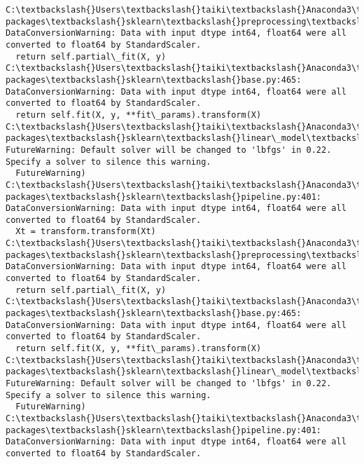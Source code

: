 \documentclass[a4j, dvipdfmx]{jsarticle}
\begin{document}
    \begin{Verbatim}[commandchars=\\\{\}]
C:\textbackslash{}Users\textbackslash{}taiki\textbackslash{}Anaconda3\textbackslash{}Lib\textbackslash{}site-packages\textbackslash{}sklearn\textbackslash{}preprocessing\textbackslash{}data.py:625: DataConversionWarning: Data with input dtype int64, float64 were all converted to float64 by StandardScaler.
  return self.partial\_fit(X, y)
C:\textbackslash{}Users\textbackslash{}taiki\textbackslash{}Anaconda3\textbackslash{}Lib\textbackslash{}site-packages\textbackslash{}sklearn\textbackslash{}base.py:465: DataConversionWarning: Data with input dtype int64, float64 were all converted to float64 by StandardScaler.
  return self.fit(X, y, **fit\_params).transform(X)
C:\textbackslash{}Users\textbackslash{}taiki\textbackslash{}Anaconda3\textbackslash{}Lib\textbackslash{}site-packages\textbackslash{}sklearn\textbackslash{}linear\_model\textbackslash{}logistic.py:433: FutureWarning: Default solver will be changed to 'lbfgs' in 0.22. Specify a solver to silence this warning.
  FutureWarning)
C:\textbackslash{}Users\textbackslash{}taiki\textbackslash{}Anaconda3\textbackslash{}Lib\textbackslash{}site-packages\textbackslash{}sklearn\textbackslash{}pipeline.py:401: DataConversionWarning: Data with input dtype int64, float64 were all converted to float64 by StandardScaler.
  Xt = transform.transform(Xt)
C:\textbackslash{}Users\textbackslash{}taiki\textbackslash{}Anaconda3\textbackslash{}Lib\textbackslash{}site-packages\textbackslash{}sklearn\textbackslash{}preprocessing\textbackslash{}data.py:625: DataConversionWarning: Data with input dtype int64, float64 were all converted to float64 by StandardScaler.
  return self.partial\_fit(X, y)
C:\textbackslash{}Users\textbackslash{}taiki\textbackslash{}Anaconda3\textbackslash{}Lib\textbackslash{}site-packages\textbackslash{}sklearn\textbackslash{}base.py:465: DataConversionWarning: Data with input dtype int64, float64 were all converted to float64 by StandardScaler.
  return self.fit(X, y, **fit\_params).transform(X)
C:\textbackslash{}Users\textbackslash{}taiki\textbackslash{}Anaconda3\textbackslash{}Lib\textbackslash{}site-packages\textbackslash{}sklearn\textbackslash{}linear\_model\textbackslash{}logistic.py:433: FutureWarning: Default solver will be changed to 'lbfgs' in 0.22. Specify a solver to silence this warning.
  FutureWarning)
C:\textbackslash{}Users\textbackslash{}taiki\textbackslash{}Anaconda3\textbackslash{}Lib\textbackslash{}site-packages\textbackslash{}sklearn\textbackslash{}pipeline.py:401: DataConversionWarning: Data with input dtype int64, float64 were all converted to float64 by StandardScaler.

\end{Verbatim}
\end{document}
